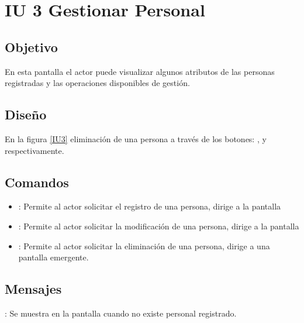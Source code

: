 \section{IU 3 Gestionar Personal}

\subsection{Objetivo}
	En esta pantalla el actor puede visualizar algunos atributos de las personas registradas y las operaciones disponibles de gestión.
\subsection{Diseño}
	En la figura \ref{IU3} eliminación de una persona a través de los botones: , \editar y \eliminar respectivamente.

\label{IU3}
\subsection{Comandos}
\begin{itemize}
	\item {}: Permite al actor solicitar el registro de una persona, dirige a la pantalla 
	\item \editar [Modificar]: Permite al actor solicitar la modificación de una persona, dirige a la pantalla 
	\item \eliminar [Eliminar]: Permite al actor solicitar la eliminación de una persona, dirige a una pantalla emergente.
\end{itemize}

\subsection{Mensajes}

\begin{Citemize}
	\item {}: Se muestra en la pantalla  cuando no existe personal registrado.
\end{Citemize}
